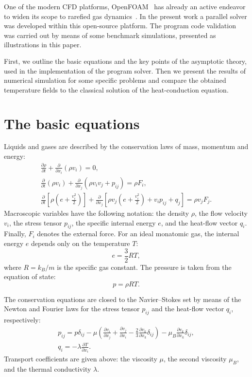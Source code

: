 \documentclass[smallextended, referee]{svjour3} %
\newcommand{\pder}[2][]{\frac{\partial#1}{\partial#2}}
\begin{document}
One of the modern CFD platforms, OpenFOAM\textregistered{}~\cite{OpenFOAM1998, OpenFOAM2010} has
already an active endeavor to widen its scope to rarefied gas dynamics~\cite{Pantazis2012}.
In the present work a parallel solver was developed within this open-source platform.
The program code validation was carried out by means of some benchmark simulations,
presented as illustrations in this paper.

First, we outline the basic equations and the key points of the asymptotic theory,
used in the implementation of the program solver.
Then we present the results of numerical simulation for some specific problems
and compare the obtained temperature fields to the classical solution
of the heat-conduction equation.

\section{The basic equations}

Liquids and gases are described by the conservation laws of mass, momentum and energy:
\begin{gather}
	\pder[\rho]{t} + \pder{x_i}(\rho v_i) = 0, \label{eq:mass}\\
	\pder{t}(\rho v_i) + \pder{x_j}(\rho v_i v_j + p_{ij}) = \rho F_i, \label{eq:momentum}\\
	\pder{t}\left[\rho\left(e+\frac{v_i^2}2\right)\right] +
		\pder{x_j}\left[\rho v_j\left(e+\frac{v_i^2}2\right)+v_i p_{ij}+q_j\right] = \rho v_j F_j. \label{eq:energy}
\end{gather}
Macroscopic variables have the following notation: the density \(\rho\), the flow velocity \(v_i\), the stress tensor \(p_{ij}\),
the specific internal energy \(e\), and the heat-flow vector \(q_i\). Finally, \(F_i\) denotes the external force.
For an ideal monatomic gas, the internal energy \(e\) depends only on the temperature \(T\):
\[ e = \frac32RT, \]
where \(R = k_B / m\) is the specific gas constant. The pressure is taken from the equation of state:
\[ p = \rho RT. \]

The conservation equations are closed to the Navier--Stokes set by means of the Newton and Fourier laws
for the stress tensor \(p_{ij}\) and the heat-flow vector \(q_i\), respectively:
\begin{gather}
	p_{ij} = p\delta_{ij} - \mu\left(\pder[v_i]{x_j}+\pder[v_j]{x_i}-\frac23\pder[v_k]{x_k}\delta_{ij}\right) -
		\mu_B\pder[v_k]{x_k}\delta_{ij}, \label{eq:stress_tensor}\\
	q_i = -\lambda\pder[T]{x_i}. \label{eq:heat_flow}
\end{gather}
Transport coefficients are given above:
the viscosity \(\mu\), the second viscosity \(\mu_B\), and the thermal conductivity \(\lambda\).
\end{document}
